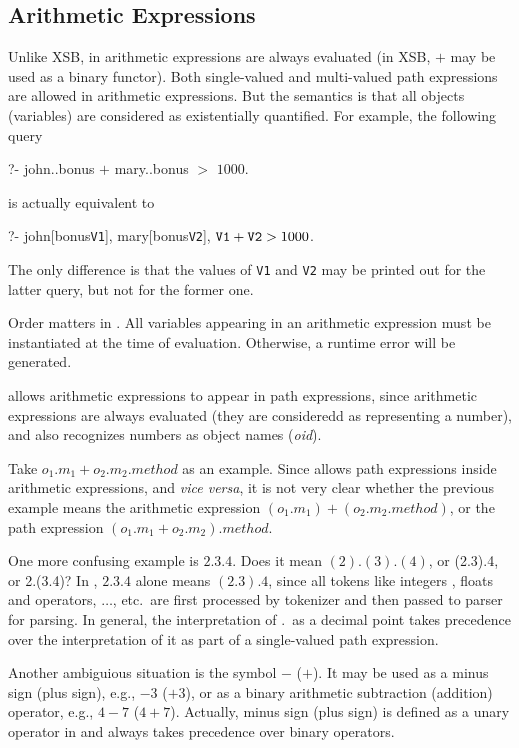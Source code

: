 \documentclass[11pt]{report}
\begin{document}
\subsection{Arithmetic Expressions}

Unlike XSB, in \FLORA arithmetic expressions are always evaluated (in XSB, $+$ may be used
as a binary functor). Both single-valued and multi-valued path expressions are allowed in
arithmetic expressions. But the semantics is that all objects (variables) are considered as
existentially quantified. For example, the following query
\begin{qrules}
?- john..bonus $+$ mary..bonus $>$ $1000$.
\end{qrules}
is actually equivalent to
\begin{qrules}
?- john[bonus{\mvd}{\tt V1}], mary[bonus{\mvd}{\tt V2}], ${\tt V1}+{\tt V2} > 1000$.
\end{qrules}
The only difference is that the values of {\tt V1} and {\tt V2} may be printed out for the
latter query, but not for the former one.

Order matters in \FLORA. All variables appearing in an arithmetic expression must be
instantiated at the time of evaluation. Otherwise, a runtime error will be generated.

\FLORA allows arithmetic expressions to appear in path expressions, since arithmetic
expressions are always evaluated (they are consideredd as representing a number), and \FLORA
also recognizes numbers as object names ({\it oid}).

Take $o_1.m_1+o_2.m_2.method$ as an example. Since \FLORA allows path expressions inside
arithmetic expressions, and {\it vice versa}, it is not very clear whether the previous
example means the arithmetic expression $(o_1.m_1)+(o_2.m_2.method)$, or the path expression
$(o_1.m_1+o_2.m_2).method$.

One more confusing example is $2.3.4$. Does it mean $(2).(3).(4)$, or (2.3).4, or 2.(3.4)?
In \FLORA, $2.3.4$ alone means $(2.3).4$, since all tokens like integers , floats and
operators, $\ldots$, etc.\ are first processed by \FLORA tokenizer and then passed to \FLORA
parser for parsing. In general, the interpretation of .\ as a decimal point takes precedence
over the interpretation of it as part of a single-valued path expression.

Another ambiguious situation is the symbol $-$ ($+$). It may be used as a minus sign (plus
sign), e.g., $-3$ ($+3$), or as a binary arithmetic subtraction (addition) operator, e.g.,
$4-7$ ($4+7$). Actually, minus sign (plus sign) is defined as a unary
operator in \FLORA and always takes precedence over binary operators.
\end{document}
